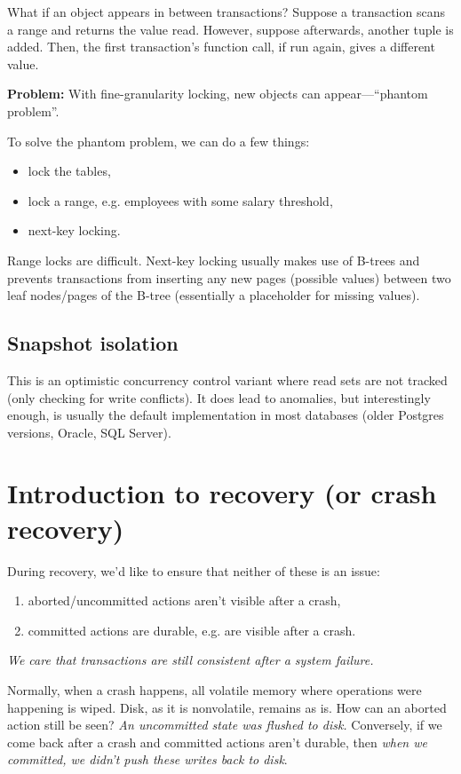 \documentclass{article}
\begin{document}
What if an object appears in between transactions? Suppose a transaction scans a range and returns the value read. However, suppose afterwards, another tuple is added. Then, the first transaction's function call, if run again, gives a different value.

\textbf{Problem:} With fine-granularity locking, new objects can appear---``phantom problem''.

To solve the phantom problem, we can do a few things:
\begin{itemize}
    \item lock the tables,
    \item lock a range, e.g. employees with some salary threshold,
    \item next-key locking.
\end{itemize}
Range locks are difficult. Next-key locking usually makes use of B-trees and prevents transactions from inserting any new pages (possible values) between two leaf nodes/pages of the B-tree (essentially a placeholder for missing values).

\subsection{Snapshot isolation}

This is an optimistic concurrency control variant where read sets are not tracked (only checking for write conflicts). It does lead to anomalies, but interestingly enough, is usually the default implementation in most databases (older Postgres versions, Oracle, SQL Server).

\section{Introduction to recovery (or crash recovery)}

During recovery, we'd like to ensure that neither of these is an issue: \begin{enumerate}
\item aborted/uncommitted actions aren't visible after a crash,
\item committed actions are durable, e.g. are visible after a crash.
\end{enumerate}

\emph{We care that transactions are still consistent after a system failure.}

Normally, when a crash happens, all volatile memory where operations were happening is wiped. Disk, as it is nonvolatile, remains as is. How can an aborted action still be seen? \emph{An uncommitted state was flushed to disk.} Conversely, if we come back after a crash and committed actions aren't durable, then \emph{when we committed, we didn't push these writes back to disk}.
\end{document}
